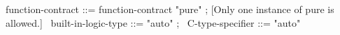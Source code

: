 \begin{syntax}
function-contract ::= function-contract "pure" ; [Only one instance of pure is allowed.] 
\
built-in-logic-type ::= "auto" ;
\
C-type-specifier ::= "auto" 
\end{syntax}
